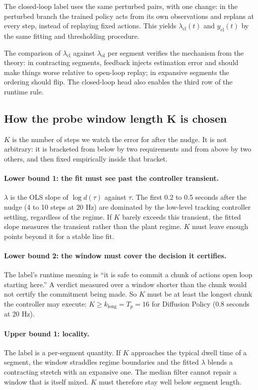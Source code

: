 \documentclass[11pt]{article}
\begin{document}
The closed-loop label uses the same perturbed pairs, with one change: in the perturbed
branch the trained policy acts from its own observations and replans at every step,
instead of replaying fixed actions. This yields $\lambda_{\mathrm{cl}}(t)$ and
$y_{\mathrm{cl}}(t)$ by the same fitting and thresholding procedure.

The comparison of $\lambda_{\mathrm{cl}}$ against $\lambda_{\mathrm{ol}}$ per segment
verifies the mechanism from the theory: in contracting segments, feedback injects
estimation error and should make things worse relative to open-loop replay; in expansive
segments the ordering should flip. The closed-loop head also enables the third row of
the runtime rule.

\subsection{How the probe window length K is chosen}
\label{sec:choosingK}

$K$ is the number of steps we watch the error for after the nudge. It is not
arbitrary: it is bracketed from below by two requirements and from above by two
others, and then fixed empirically inside that bracket.

\paragraph{Lower bound 1: the fit must see past the controller transient.}
$\lambda$ is the OLS slope of $\log d(\tau)$ against $\tau$. The first 0.2 to 0.5
seconds after the nudge (4 to 10 steps at 20 Hz) are dominated by the low-level
tracking controller settling, regardless of the regime. If $K$ barely exceeds this
transient, the fitted slope measures the transient rather than the plant regime.
$K$ must leave enough points beyond it for a stable line fit.

\paragraph{Lower bound 2: the window must cover the decision it certifies.}
The label's runtime meaning is ``it is safe to commit a chunk of actions open loop
starting here.'' A verdict measured over a window shorter than the chunk would not
certify the commitment being made. So $K$ must be at least the longest chunk the
controller may execute: $K \geq k_{\mathrm{long}} = T_p = 16$ for Diffusion Policy
(0.8 seconds at 20 Hz).

\paragraph{Upper bound 1: locality.}
The label is a per-segment quantity. If $K$ approaches the typical dwell time of a
segment, the window straddles regime boundaries and the fitted $\lambda$ blends a
contracting stretch with an expansive one. The median filter cannot repair a window
that is itself mixed. $K$ must therefore stay well below segment length.
\end{document}
